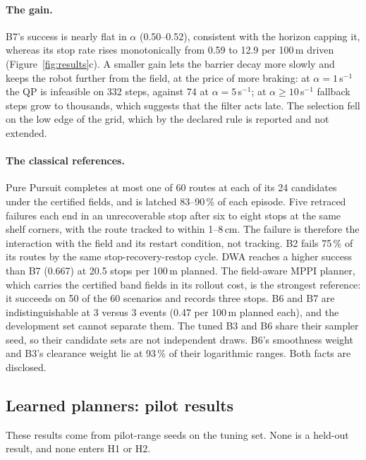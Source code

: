 \documentclass[11pt]{article}
\theoremstyle{definition}
\begin{document}
\paragraph{The gain.} B7's success is nearly flat in $\alpha$ (0.50--0.52), consistent with the horizon capping it, whereas its stop rate rises monotonically from 0.59 to 12.9 per 100\,m driven (Figure~\ref{fig:results}c).
A smaller gain lets the barrier decay more slowly and keeps the robot further from the field, at the price
of more braking: at $\alpha=1$\,s$^{-1}$ the QP is infeasible on 332 steps, against 74 at
$\alpha=5$\,s$^{-1}$; at $\alpha\ge10$\,s$^{-1}$ fallback steps grow to thousands, which suggests that the filter acts late. The selection fell on the low edge of the grid, which by the declared rule is reported and not
extended.

\paragraph{The classical references.} Pure Pursuit completes at most one of 60 routes at each of its 24 candidates under the
certified fields, and is latched 83--90\,\% of each episode. Five retraced failures each end in an unrecoverable stop after
six to eight stops at the same shelf corners, with the route tracked to within 1--8\,cm. The failure is therefore the
interaction with the field and its restart condition, not tracking. B2 fails 75\,\% of its routes by the same
stop-recovery-restop cycle. DWA reaches a higher success than B7 (0.667) at 20.5 stops per 100\,m planned. The field-aware
MPPI planner, which carries the certified band fields in its rollout cost, is the strongest reference: it succeeds on 50
of the 60 scenarios and records three stops. B6 and B7 are indistinguishable at 3 versus 3 events (0.47 per 100\,m planned
each), and the development set cannot separate them. The tuned B3 and B6 share their sampler seed, so their candidate
sets are not independent draws. B6's smoothness weight and B3's clearance weight lie at 93\,\% of their logarithmic
ranges. Both facts are disclosed.

\subsection{Learned planners: pilot results}\label{sec:res-learned}
These results come from pilot-range seeds on the tuning set. None is a held-out result, and none enters H1 or H2.
\end{document}
